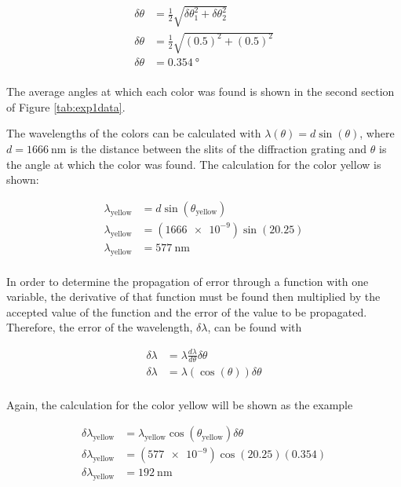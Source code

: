 \documentclass{article}
\begin{document}
\begin{align*}
  \delta\theta &= \frac{1}{2} \sqrt{\delta\theta_1 ^ 2 + \delta\theta_2 ^2} \\
  \delta\theta &= \frac{1}{2} \sqrt{(0.5)^2 + (0.5)^2} \\
  \delta\theta &= \SI{0.354}{\degree} \\
\end{align*}

\qq The average angles at which each color was found is shown in the second
section of Figure \ref{tab:exp1data}.

\qq The wavelengths of the colors can be calculated with
\(\lambda(\theta) = d \sin{(\theta)}\), where \(d = \SI{1666}{\nano\meter}\) is
the distance between the slits of the diffraction grating and \(\theta\) is the
angle at which the color was found. The calculation for the color yellow is
shown:

\begin{align*}
  \lambda_{\text{yellow}} &= d \sin{(\theta_{\text{yellow}})} \\
  \lambda_{\text{yellow}} &= (\num{1666e-9}) \sin{(20.25)} \\
  \lambda_{\text{yellow}} &= \SI{577}{\nano\meter} \\
\end{align*}

\qq In order to determine the propagation of error through a function with one
variable, the derivative of that function must be found then multiplied by the
accepted value of the function and the error of the value to be
propagated. Therefore, the error of the wavelength, \(\delta\lambda\), can be
found with

\begin{align*}
  \delta\lambda &= \lambda \frac{d \lambda}{d \theta} \delta\theta \\
  \delta\lambda &= \lambda (\cos{(\theta)}) \delta\theta \\
\end{align*}

Again, the calculation for the color yellow will be shown as the example

\begin{align*}
  \delta\lambda_{\text{yellow}} &= \lambda_{\text{yellow}}
                                  \cos{(\theta_{\text{yellow}})} \delta\theta \\
  \delta\lambda_{\text{yellow}} &= (\num{577e-9}) \cos{(20.25)} (0.354) \\
  \delta\lambda_{\text{yellow}} &= \SI{192}{\nano\meter} \\
\end{align*}
\end{document}
